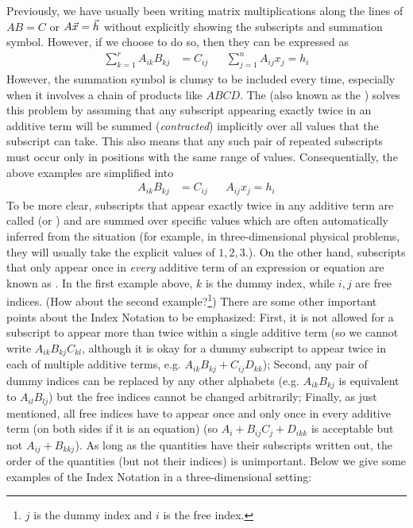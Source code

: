 Previously, we have usually been writing matrix multiplications along the lines of $AB = C$ or $A\vec{x} = \smash{\vec{h}}$ without explicitly showing the subscripts and summation symbol. However, if we choose to do so, then they can be expressed as
\begin{align*}
\sum_{k=1}^r A_{ik}B_{kj} &= C_{ij} &  & \sum_{j=1}^n A_{ij}x_j = h_i
\end{align*}
However, the summation symbol is clumsy to be included every time, especially when it involves a chain of products like $ABCD$. The  (also known as the ) solves this problem by assuming that any subscript appearing exactly twice in an additive term will be summed (\textit{contracted}) implicitly over all values that the subscript can take. This also means that any such pair of repeated subscripts must
occur only in positions with the same range of values. Consequentially, the above examples are simplified into
\begin{align*}
A_{ik}B_{kj} &= C_{ij} &  & A_{ij}x_j = h_i    
\end{align*}
To be more clear, subscripts that appear exactly twice in any additive term are called  (or ) and are summed over specific values which are often automatically inferred from the situation (for example, in three-dimensional physical problems, they will usually take the explicit values of $1,2,3$.). On the other hand, subscripts that only appear once in \textit{every} additive term of an expression or equation are known as . In the first example above, $k$ is the dummy index, while $i, j$ are free indices. (How about the second example?\footnote{$j$ is the dummy index and $i$ is the free index.}) There are some other important points about the Index Notation to be emphasized: First, it is not allowed for a subscript to appear more than twice within a single additive term (so we cannot write $A_{ik}B_{kj}C_{kl}$, although it is okay for a dummy subscript to appear twice in each of multiple additive terms, e.g. $A_{ik}B_{kj} + C_{ij}D_{kk}$); Second, any pair of dummy indices can be replaced by any other alphabets (e.g. $A_{ik}B_{kj}$ is equivalent to $A_{il}B_{lj}$) but the free indices cannot be changed arbitrarily; Finally, as just mentioned, all free indices have to appear once and only once in every additive term (on both sides if it is an equation) (so $A_i + B_{ij}C_{j} + D_{ikk}$ is acceptable but not $A_{ij} + B_{kkj}$). As long as the quantities have their subscripts written out, the order of the quantities (but not their indices) is unimportant. Below we give some examples of the Index Notation in a three-dimensional setting:
